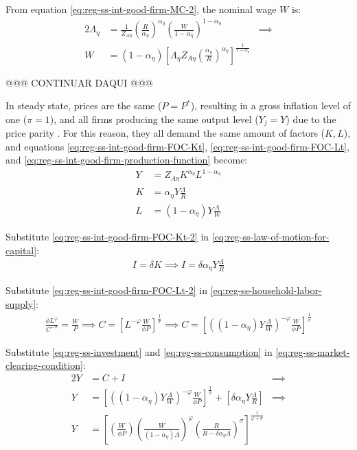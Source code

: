 \documentclass[
	thesis.tex
	]{subfiles}
\begin{document}
From equation \ref{eq:reg-ss-int-good-firm-MC-2}, the nominal wage $W$ is:
\begin{alignat}{2}
	\Lambda_{\eta} &= \frac{1}{Z_{A\eta}} \left( \frac{R}{{\alpha_\eta}} \right)^{{\alpha_\eta}} \left( \frac{W}{1-{\alpha_\eta}} \right)^{1-{\alpha_\eta}} &\implies \nonumber \\ 
	W &= (1-{\alpha_\eta}) \left[ \Lambda_{\eta} Z_{A\eta} \left( \frac{{\alpha_\eta}}{R} \right)^{{\alpha_\eta}} \right]^\frac{1}{1-{\alpha_\eta}} &\, \label{eq:reg-ss-nominal-wage}
\end{alignat}

@@@ CONTINUAR DAQUI @@@

In steady state, prices are the same ($P=P^\ast$), resulting in a gross inflation level of one ($\pi=1$), and all firms producing the same output level ($Y_j=Y$) due to the price parity \cite[Lecture 13, p.12]{solis-garcia_ucb_2022}. For this reason, they all demand the same amount of factors ($K,L$), and equations \ref{eq:reg-ss-int-good-firm-FOC-Kt}, \ref{eq:reg-ss-int-good-firm-FOC-Lt}, and \ref{eq:reg-ss-int-good-firm-production-function} become:
\begin{align}
	\label{eq:reg-ss-int-good-firm-production-function-2}
	Y &= Z_{A\eta} K^{\alpha_\eta} L^{1-{\alpha_\eta}}   \\
	\label{eq:reg-ss-int-good-firm-FOC-Kt-2}
	K &= {\alpha_\eta} Y \frac{\Lambda}{R}    \\
	\label{eq:reg-ss-int-good-firm-FOC-Lt-2}
	L &= (1-{\alpha_\eta}) Y \frac{\Lambda}{W}
\end{align}

Substitute \ref{eq:reg-ss-int-good-firm-FOC-Kt-2} in \ref{eq:reg-ss-law-of-motion-for-capital}:
\begin{align}
	\label{eq:reg-ss-investment}
	I = \delta K \implies I = \delta {\alpha_\eta} Y \frac{\Lambda}{R}
\end{align}

Substitute \ref{eq:reg-ss-int-good-firm-FOC-Lt-2} in \ref{eq:reg-ss-household-labor-supply}:
\begin{align}
	\label{eq:reg-ss-consumption}
	\frac{\phi L^{\varphi}}{C^{-\sigma}} = \frac{W}{P}
	\implies
	C = \left[ L^{-\varphi} \frac{W}{\phi P} \right]^{\frac{1}{\sigma}}
	\implies
	C = \left[ \left( (1-{\alpha_\eta}) Y \frac{\Lambda}{W} \right)^{-\varphi} \frac{W}{\phi P} \right]^{\frac{1}{\sigma}}
\end{align}

Substitute \ref{eq:reg-ss-investment} and \ref{eq:reg-ss-consumption} in \ref{eq:reg-ss-market-clearing-condition}:
\begin{alignat}{2}
	Y &= C + I &\implies \nonumber \\
	Y &= \left[ \left( (1-{\alpha_\eta}) Y \frac{\Lambda}{W} \right)^{-\varphi} \frac{W}{\phi P} \right]^{\frac{1}{\sigma}} + \left[ \delta {\alpha_\eta} Y \frac{\Lambda}{R} \right] &\implies \nonumber \\
	Y &=\left[
	\left( \frac{W}{\phi P}                \right)
	\left( \frac{W}{(1-{\alpha_\eta})\Lambda}     \right)^\varphi
	\left( \frac{R}{R-\delta{\alpha_\eta}\Lambda} \right)^\sigma
	\right]^\frac{1}{\varphi+\sigma} & \label{eq:reg-ss-production}
\end{alignat}
\end{document}
